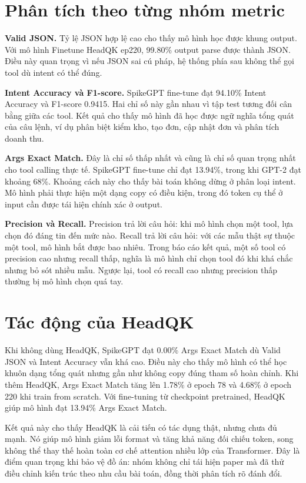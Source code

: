 \documentclass[12pt,a4paper,oneside]{report}
\newlength{\manualparindent}
\newcommand{\manualindent}{\hspace*{\manualparindent}}
\begin{document}
\section{Phân tích theo từng nhóm metric}

\manualindent%
\textbf{Valid JSON.} Tỷ lệ JSON hợp lệ cao cho thấy mô hình học được khung output. Với mô hình Finetune HeadQK ep220, 99.80\% output parse được thành JSON. Điều này quan trọng vì nếu JSON sai cú pháp, hệ thống phía sau không thể gọi tool dù intent có thể đúng.

\manualindent%
\textbf{Intent Accuracy và F1-score.} SpikeGPT fine-tune đạt 94.10\% Intent Accuracy và F1-score 0.9415. Hai chỉ số này gần nhau vì tập test tương đối cân bằng giữa các tool. Kết quả cho thấy mô hình đã học được ngữ nghĩa tổng quát của câu lệnh, ví dụ phân biệt kiểm kho, tạo đơn, cập nhật đơn và phân tích doanh thu.

\manualindent%
\textbf{Args Exact Match.} Đây là chỉ số thấp nhất và cũng là chỉ số quan trọng nhất cho tool calling thực tế. SpikeGPT fine-tune chỉ đạt 13.94\%, trong khi GPT-2 đạt khoảng 68\%. Khoảng cách này cho thấy bài toán không dừng ở phân loại intent. Mô hình phải thực hiện một dạng copy có điều kiện, trong đó token cụ thể ở input cần được tái hiện chính xác ở output.

\manualindent%
\textbf{Precision và Recall.} Precision trả lời câu hỏi: khi mô hình chọn một tool, lựa chọn đó đáng tin đến mức nào. Recall trả lời câu hỏi: với các mẫu thật sự thuộc một tool, mô hình bắt được bao nhiêu. Trong báo cáo kết quả, một số tool có precision cao nhưng recall thấp, nghĩa là mô hình chỉ chọn tool đó khi khá chắc nhưng bỏ sót nhiều mẫu. Ngược lại, tool có recall cao nhưng precision thấp thường bị mô hình chọn quá tay.

\section{Tác động của HeadQK}

\manualindent%
Khi không dùng HeadQK, SpikeGPT đạt 0.00\% Args Exact Match dù Valid JSON và Intent Accuracy vẫn khá cao. Điều này cho thấy mô hình có thể học khuôn dạng tổng quát nhưng gần như không copy đúng tham số hoàn chỉnh. Khi thêm HeadQK, Args Exact Match tăng lên 1.78\% ở epoch 78 và 4.68\% ở epoch 220 khi train from scratch. Với fine-tuning từ checkpoint pretrained, HeadQK giúp mô hình đạt 13.94\% Args Exact Match.

\manualindent%
Kết quả này cho thấy HeadQK là cải tiến có tác dụng thật, nhưng chưa đủ mạnh. Nó giúp mô hình giảm lỗi format và tăng khả năng đối chiếu token, song không thể thay thế hoàn toàn cơ chế attention nhiều lớp của Transformer. Đây là điểm quan trọng khi bảo vệ đồ án: nhóm không chỉ tái hiện paper mà đã thử điều chỉnh kiến trúc theo nhu cầu bài toán, đồng thời phân tích rõ đánh đổi.
\end{document}
